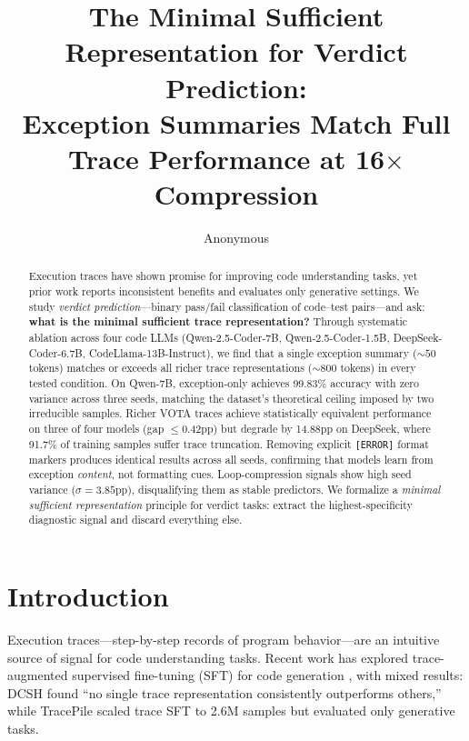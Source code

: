 \documentclass[11pt,a4paper]{article}
\title{The Minimal Sufficient Representation for Verdict Prediction:\\Exception Summaries Match Full Trace Performance at 16$\times$ Compression}
\author{Anonymous}
\begin{document}
\maketitle

\begin{abstract}
Execution traces have shown promise for improving code understanding tasks, yet prior work reports inconsistent benefits and evaluates only generative settings.
We study \emph{verdict prediction}---binary pass/fail classification of code--test pairs---and ask: \textbf{what is the minimal sufficient trace representation?}
Through systematic ablation across four code LLMs (Qwen-2.5-Coder-7B, Qwen-2.5-Coder-1.5B, DeepSeek-Coder-6.7B, CodeLlama-13B-Instruct), we find that a single exception summary (${\sim}50$ tokens) matches or exceeds all richer trace representations (${\sim}800$ tokens) in every tested condition.
On Qwen-7B, exception-only achieves 99.83\% accuracy with zero variance across three seeds, matching the dataset's theoretical ceiling imposed by two irreducible samples.
Richer VOTA traces achieve statistically equivalent performance on three of four models (gap $\leq 0.42$pp) but degrade by 14.88pp on DeepSeek, where 91.7\% of training samples suffer trace truncation.
Removing explicit \texttt{[ERROR]} format markers produces identical results across all seeds, confirming that models learn from exception \emph{content}, not formatting cues.
Loop-compression signals show high seed variance ($\sigma = 3.85$pp), disqualifying them as stable predictors.
We formalize a \emph{minimal sufficient representation} principle for verdict tasks: extract the highest-specificity diagnostic signal and discard everything else.
\end{abstract}

\section{Introduction}

Execution traces---step-by-step records of program behavior---are an intuitive source of signal for code understanding tasks.
Recent work has explored trace-augmented supervised fine-tuning (SFT) for code generation \cite{ni2024next,ding2024traced}, with mixed results: DCSH \cite{ni2024next} found ``no single trace representation consistently outperforms others,'' while TracePile \cite{gu2025tracepile} scaled trace SFT to 2.6M samples but evaluated only generative tasks.
\end{document}
